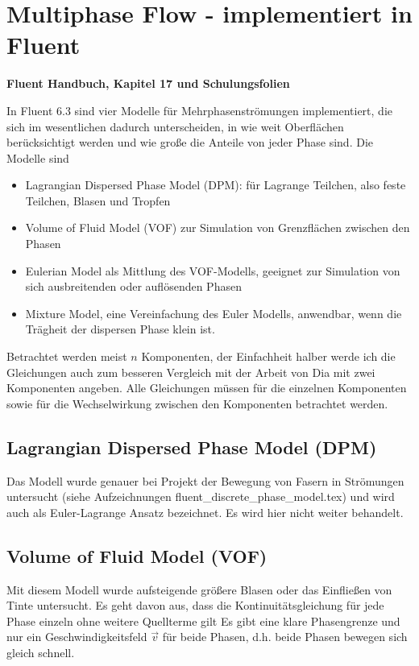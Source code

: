 \section{Multiphase Flow - implementiert in Fluent}

{\bf Fluent Handbuch, Kapitel 17 und Schulungsfolien}

In Fluent 6.3 sind vier Modelle für Mehrphasenströmungen
implementiert, die sich im wesentlichen dadurch unterscheiden, in wie
weit Oberflächen berücksichtigt werden und wie große die Anteile von
jeder Phase sind. Die Modelle sind
\begin{itemize}
\item Lagrangian Dispersed Phase Model (DPM): für Lagrange Teilchen,
  also feste Teilchen, Blasen und Tropfen
\item Volume of Fluid Model (VOF) zur Simulation von Grenzflächen
  zwischen den Phasen
\item Eulerian Model als Mittlung des VOF-Modells, geeignet zur
  Simulation von sich ausbreitenden oder auflösenden Phasen
\item Mixture Model, eine Vereinfachung des Euler Modells, anwendbar,
  wenn die Trägheit der dispersen Phase klein ist.
\end{itemize}
Betrachtet werden meist $n$ Komponenten, der Einfachheit halber werde
ich die Gleichungen auch zum besseren Vergleich mit der Arbeit von Dia
mit zwei Komponenten angeben. Alle Gleichungen müssen für die
einzelnen Komponenten sowie für die Wechselwirkung zwischen den
Komponenten betrachtet werden.

\subsection{\bf  Lagrangian Dispersed Phase Model (DPM)}

Das Modell wurde genauer bei Projekt der Bewegung von Fasern in
Strömungen untersucht (siehe Aufzeichnungen
fluent\_discrete\_phase\_model.tex) und wird auch als Euler-Lagrange
Ansatz bezeichnet. Es wird hier nicht weiter behandelt.

\subsection{\bf Volume of Fluid Model (VOF)}

Mit diesem Modell wurde aufsteigende größere Blasen oder das
Einfließen von Tinte untersucht. Es geht davon aus, dass die
Kontinuitätsgleichung für jede Phase einzeln ohne weitere Quellterme
gilt Es gibt eine klare Phasengrenze und nur ein Geschwindigkeitsfeld
$\vec{v}$ für beide Phasen, d.h. beide Phasen bewegen sich gleich
schnell.

